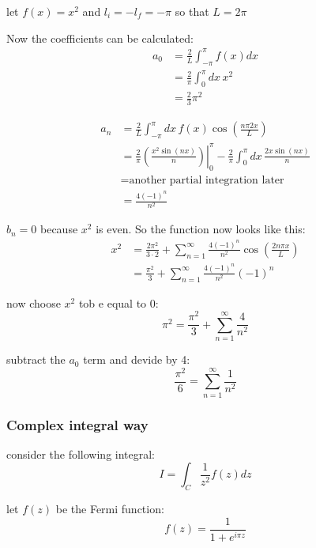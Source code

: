 \documentclass[12pt,a4paper]{article}
\numberwithin{equation}{section}
\begin{document}
let $f(x) = x^2$ and $l_i = -l_f = -\pi$ so that $L = 2\pi$

Now the coefficients can be calculated:
\begin{align}
a_0 &= \frac{2}{L} \int_{-\pi}^\pi f(x) dx \\
&= \frac{2}{\pi} \int_0^\pi dx\, x^2\\
&= \frac{2}{3}\pi^2
\end{align}

\begin{align}
a_n &= \frac{2}{L} \int_{-\pi}^\pi dx\, f(x) \cos\left(\frac{n \pi 2 x}{L} \right) \\
&= \frac{2}{\pi }\left.\left(  \frac{x^2 \sin(nx)}{n} \right)\right|_0^\pi - \frac{2}{\pi} \int_0^\pi dx\, \frac{2x \sin(nx)}{n}\\
&=\text{another partial integration later}\\
&= \frac{4 (-1)^n}{n^2}
\end{align}

$b_n = 0$ because $x^2$ is even. So the function now looks like this:
\begin{align}
x^2 &= \frac{2\pi^2}{3\cdot 2} + \sum_{n=1}^\infty \frac{4 (-1)^n}{n^2} \cos\left( \frac{2n\pi x}{L}  \right) \\
&= \frac{\pi^2}{3} + \sum_{n=1}^\infty \frac{4 (-1)^n}{n^2} (-1)^n
\end{align}

now choose $x^2$ tob e equal to 0:
\begin{equation}
\pi^2 = \frac{\pi^2}{3} + \sum_{n=1}^\infty \frac{4}{n^2}
\end{equation}

subtract the $a_0$ term and devide by 4:
\begin{equation}
\frac{\pi^2}{6} = \sum_{n=1}^\infty \frac{1}{n^2}
\end{equation}

\subsubsection*{Complex integral way}

consider the following integral:
\begin{equation}
I = \int_C \frac{1}{z^2} f(z) dz
\end{equation}

let $f(z) $ be the Fermi function:
\begin{equation}
f(z) = \frac{1}{1+ e^{i\pi z}}
\end{equation}
\end{document}
